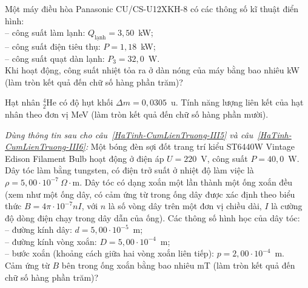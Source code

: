 	\begin{ex}%
		Một máy điều hòa Panasonic CU/CS-U12XKH-8 có các thông số kĩ thuật điển hình:\\
		-- công suất làm lạnh: $Q_{\text{lạnh}}=3{,}50$~kW;\\
		-- công suất điện tiêu thụ: $P=1{,}18$~kW;\\
		-- công suất quạt dàn lạnh: $P_3=32{,}0$~W.\\
		Khi hoạt động, công suất nhiệt tỏa ra ở dàn nóng của máy bằng bao nhiêu kW (làm tròn kết quả đến chữ số hàng phần trăm)?
		\par
	\end{ex}

	\begin{ex}%
		Hạt nhân ${}^4_2\text{He}$ có độ hụt khối $\Delta m=0{,}0305$~u. Tính năng lượng liên kết của hạt nhân theo đơn vị MeV (làm tròn kết quả đến chữ số hàng phần mười).
		\par
	\end{ex}

	\begin{ex}%
		\label{HaTinh-CumLienTruong-III5}
		\textit{Dùng thông tin sau cho câu~\ref{HaTinh-CumLienTruong-III5} và câu~\ref{HaTinh-CumLienTruong-III6}:} Một bóng đèn sợi đốt trang trí kiểu ST6440W Vintage Edison Filament Bulb hoạt động ở điện áp $U=220$~V, công suất $P=40{,}0$~W. Dây tóc làm bằng tungsten, có điện trở suất ở nhiệt độ làm việc là $\rho=5{,}00\cdot 10^{-7}~\Omega\cdot\text{m}$. Dây tóc có dạng xoắn một lần thành một ống xoắn đều (xem như một ống dây, có cảm ứng từ trong ống dây được xác định theo biểu thức $B=4\pi\cdot 10^{-7}nI$, với $n$ là số vòng dây trên một đơn vị chiều dài, $I$ là cường độ dòng điện chạy trong dây dẫn của ống). Các thông số hình học của dây tóc:\\
		-- đường kính dây: $d=5{,}00\cdot 10^{-5}$~m;\\
		-- đường kính vòng xoắn: $D=5{,}00\cdot 10^{-4}$~m;\\
		-- bước xoắn (khoảng cách giữa hai vòng xoắn liên tiếp): $p=2{,}00\cdot 10^{-4}$~m.\\
		Cảm ứng từ $B$ bên trong ống xoắn bằng bao nhiêu mT (làm tròn kết quả đến chữ số hàng phần trăm)?
		\par
	\end{ex}

